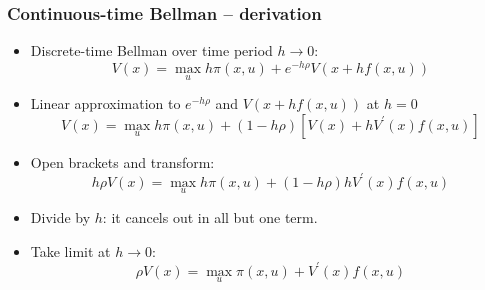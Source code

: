 \documentclass[bigger,handout]{beamer}
\newenvironment{stepitemize}{\begin{itemize}[<+->]}{\end{itemize} }
\begin{document}
\begin{frame}%
\frametitle{Continuous-time Bellman -- derivation}

\begin{stepitemize}
\item Discrete-time Bellman over time period $h\rightarrow 0$:%
\begin{equation*}
V(x)=\max_{u}h\pi \left( x,u\right) +e^{-h\rho }V(x+hf(x,u))
\end{equation*}

\item Linear approximation to $e^{-h\rho }$ and $V(x+hf(x,u))$ at $h=0$%
\begin{equation*}
V(x)=\max_{u}h\pi \left( x,u\right) +\left( 1-h\rho \right) \left[
V(x)+hV^{\prime }(x)f(x,u)\right]
\end{equation*}

\item Open brackets and transform:%
\begin{equation*}
h\rho V(x)=\max_{u}h\pi \left( x,u\right) +\left( 1-h\rho \right) hV^{\prime
}(x)f(x,u)
\end{equation*}

\item Divide by $h$: it cancels out in all but one term.

\item Take limit at $h\rightarrow 0$:%
\begin{equation*}
\rho V(x)=\max_{u}\pi \left( x,u\right) +V^{\prime }(x)f(x,u)
\end{equation*}
\end{stepitemize}

\end{frame}%
\end{document}
